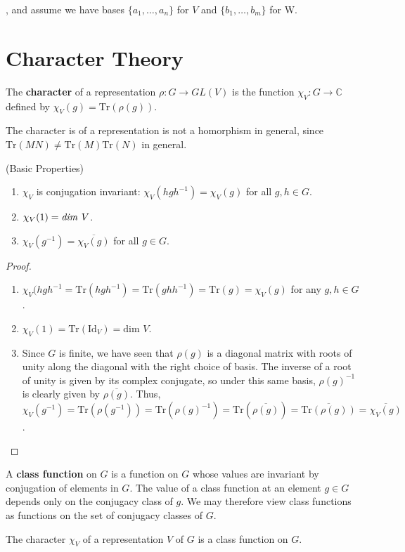 , and assume we have bases $\{ a_1, \ldots, a_n\}$ for $V$  and $\{b_1, \ldots, b_m \}$ for W.


\section{Character Theory}
\begin{defn}
The \textbf{character} of a representation $\rho \colon G \to GL(V)$ is the function $\chi_V \colon G \to \mathbb{C}$ defined by $\chi_V(g) = \text{Tr}(\rho(g))$.
\end{defn}
\begin{note}
The character is of a representation is not a homorphism in general, since $\text{Tr}(MN) \neq \text{Tr}(M) \text{Tr}(N)$ in general.
\end{note}

\begin{prop} (Basic Properties)
\begin{enumerate}
\item $\chi_V$ is conjugation invariant: $\chi_V (h g h^{-1}) = \chi_V (g)$ for all $g , h \in G$.
\item $\chi_V (1) = \text{\emph{dim }} V$.
\item \label{char-of-inverse} $\chi_V (g^{-1}) = \overline{\chi_V (g)}$ for all $g \in G$.
\end{enumerate}
\end{prop}

\begin{proof}
\begin{enumerate}
\item $\chi_V (h g h^{-1} = \text{Tr}(h g h^{-1}) = \text{Tr}(g h h^{-1}) = \text{Tr} (g) = \chi_V(g)$ for any $g,h \in G$.
\item $\chi_V(1) = \text{Tr}(\text{Id} _V) = \text{dim } V$.
\item Since $G$ is finite, we have seen that $\rho(g)$ is a diagonal matrix with roots of unity along the diagonal with the right choice of basis.  The inverse of a root of unity is given by its complex conjugate, so under this same basis, $\rho(g)^{-1}$ is clearly given by $\overline{\rho(g)}$.  Thus, $\chi_V(g^{-1}) = \text{Tr}(\rho(g^{-1})) = \text{Tr}(\rho(g)^{-1}) = \text{Tr}(\overline{\rho(g)}) = \overline{ \text{Tr} (\rho(g))} = \overline {\chi_V(g)}$.
\end{enumerate}
\end{proof}

\begin{defn}
A \textbf{class function} on $G$ is a function on $G$ whose values are invariant by conjugation of elements in $G$.  The value of a class function at an element $g \in G$ depends only on the conjugacy class of $g$.  We may therefore view class functions as functions on the set of conjugacy classes of $G$.
\end{defn}
\begin{note}
The character $\chi_V$ of a representation $V$ of $G$ is a class function on $G$.
\end{note}

